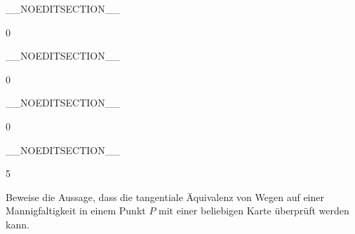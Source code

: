 __NOEDITSECTION__

{0}

{

}
{  }

__NOEDITSECTION__

{0}

{

}
{  }

__NOEDITSECTION__

{0}

{

}
{  }

__NOEDITSECTION__

{5}

{

Beweise die Aussage, dass die tangentiale Äquivalenz von Wegen auf einer Mannigfaltigkeit in einem Punkt $P$ mit einer beliebigen Karte überprüft werden kann.

}
